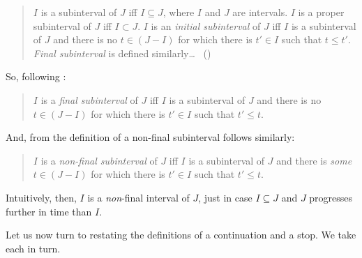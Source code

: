 \begin{note}
  \begin{quote}
    \(I\) is a subinterval of \(J\) iff \(I \subseteq J\), where \(I\) and \(J\) are intervals.
    \(I\) is a proper subinterval of \(J\) iff \(I \subset J\).
    \(I\) is an \emph{initial subinterval} of \(J\) iff \(I\) is a subinterval of \(J\) and there is no \(t \in (J - I)\) for which there is \(t' \in I\) such that \(t \leq t'\).
    \emph{Final subinterval} is defined similarly\dots\newline
    \mbox{ }\hfill\mbox{(\citeyear[140]{Dowty:1979vq})}
  \end{quote}
  So, following \citeauthor{Dowty:1979vq}:
  \begin{quote}
    \(I\) is a \emph{final subinterval} of \(J\) iff \(I\) is a subinterval of \(J\) and there is no \(t \in (J - I)\) for which there is \(t' \in I\) such that \(t' \leq t\).
  \end{quote}
  And, from the definition of a non-final subinterval follows similarly:
  \begin{quote}
    \(I\) is a \emph{non-final subinterval} of \(J\) iff \(I\) is a subinterval of \(J\) and there is \emph{some} \(t \in (J - I)\) for which there is \(t' \in I\) such that \(t' \leq t\).
  \end{quote}
  Intuitively, then, \(I\) is a \emph{non}-final interval of \(J\), just in case \(I \subseteq J\) and \(J\) progresses further in time than \(I\).

  Let us now turn to restating the definitions of a continuation and a stop.
  We take each in turn.
\end{note}

